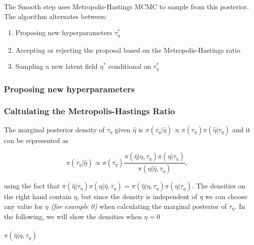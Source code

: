 \documentclass[
  letterpaper,
  DIV=11,
  numbers=noendperiod]{scrartcl}
\makeatletter
\let\oldparagraph\paragraph
\renewcommand{\paragraph}{
    \@ifstar
      \xxxParagraphStar
      \xxxParagraphNoStar
  }
\newcommand{\xxxParagraphStar}[1]{\oldparagraph*{#1}\mbox{}}
\newcommand{\xxxParagraphNoStar}[1]{\oldparagraph{#1}\mbox{}}
\providecommand{\tightlist}{%
  \setlength{\itemsep}{0pt}\setlength{\parskip}{0pt}}\usepackage{longtable,booktabs,array}
\makeatother
\begin{document}
The Smooth step uses Metropolis-Hastings MCMC to sample from this
posterior. The algorithm alternates between:

\begin{enumerate}
\def\labelenumi{\arabic{enumi}.}
\tightlist
\item
  Proposing new hyperparameters \(\tau_\eta^*\)
\item
  Accepting or rejecting the proposal based on the Metropolis-Hastings
  ratio
\item
  Sampling a new latent field \(\eta^*\) conditional on \(\tau_\eta^*\)
\end{enumerate}

\subsubsection{Proposing new
hyperparameters}\label{proposing-new-hyperparameters}

\subsubsection{Caltulating the Metropolis-Hastings
Ratio}\label{caltulating-the-metropolis-hastings-ratio}

The marginal posterior density of \(\tau_\eta\) given \(\hat \eta\) is
\(\pi(\tau_\eta\vert\hat\eta) \propto \pi(\tau_\eta)\pi(\hat\eta\vert\tau_\eta)\)
and it can be represented as

\[
\pi(\tau_\eta \vert \hat \eta) \propto \pi(\tau_\eta) \frac{\pi(\hat \eta \vert \eta, \tau_\eta)\pi(\eta \vert \tau_\eta)}{\pi(\eta \vert \hat \eta, \tau_\eta)},
\]

using the fact that
\(\pi(\hat\eta \vert \tau_\eta)\pi(\eta\vert\hat\eta, \tau_\eta) = \pi(\hat\eta\vert\eta,\tau_\eta)\pi(\eta\vert\tau_\eta)\).
The densities on the right hand contain \(\eta\), but since the density
is independent of \(\eta\) we can choose any value for \(\eta\)
\emph{(for example 0)} when calculating the marginal posterior of
\(\tau_\eta\). In the following, we will show the densities when
\(\eta = 0\)

\paragraph{\texorpdfstring{\(\pi(\hat \eta \vert \eta, \tau_\eta)\)}{\textbackslash pi(\textbackslash hat \textbackslash eta \textbackslash vert \textbackslash eta, \textbackslash tau\_\textbackslash eta)}}\label{pihat-eta-vert-eta-tau_eta}
\end{document}
